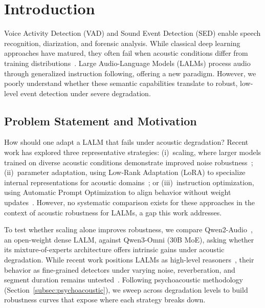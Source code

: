 \documentclass[11pt,a4paper]{article}
\begin{document}
\section{Introduction}
\label{sec:introduction}

Voice Activity Detection (VAD) and Sound Event Detection (SED) enable speech recognition, diarization, and forensic analysis. While classical deep learning approaches have matured, they often fail when acoustic conditions differ from training distributions~\cite{mihalache2022using,wang2025sincqdr,bibbo2025room}. Large Audio-Language Models (LALMs) process audio through generalized instruction following, offering a new paradigm. However, we poorly understand whether these semantic capabilities translate to robust, low-level event detection under severe degradation.

\subsection{Problem Statement and Motivation}
\label{subsec:motivation}

How should one adapt a LALM that fails under acoustic degradation? Recent work has explored three representative strategies: (i)~scaling, where larger models trained on diverse acoustic conditions demonstrate improved noise robustness~\cite{radford2023whisper, hu2024large, li2025sseu}; (ii)~parameter adaptation, using Low-Rank Adaptation (LoRA) to specialize internal representations for acoustic domains~\cite{hu2022lora, yu2024investigating, wang2025lope}; or (iii)~instruction optimization, using Automatic Prompt Optimization to align behavior without weight updates~\cite{yang2023large, ramnath2025systematic}. However, no systematic comparison exists for these approaches in the context of acoustic robustness for LALMs, a gap this work addresses.

To test whether scaling alone improves robustness, we compare Qwen2-Audio~\cite{chu2024qwen2}, an open-weight dense LALM, against Qwen3-Omni (30B MoE), asking whether its mixture-of-experts architecture offers intrinsic gains under acoustic degradation. While recent work positions LALMs as high-level reasoners~\cite{ghosh2024gama}, their behavior as fine-grained detectors under varying noise, reverberation, and segment duration remains untested~\cite{li2025sseu}. Following psychoacoustic methodology (Section~\ref{subsec:psychoacoustic}), we sweep across degradation levels to build robustness curves that expose where each strategy breaks down.
\end{document}
